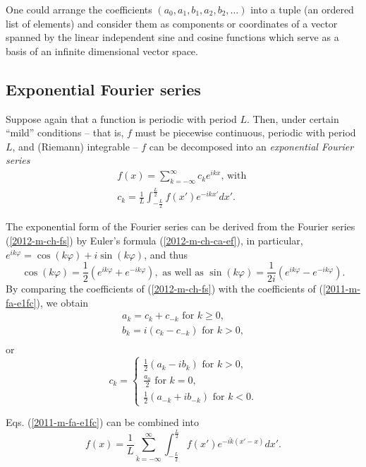 One could arrange the coefficients
$(a_0,a_1,b_1,a_2,b_2, \ldots)$
into a tuple (an ordered list of elements)
and consider them as components or coordinates of a vector spanned by the
linear independent sine and cosine functions which serve as a basis of an infinite
dimensional vector space.



\subsection{Exponential Fourier series}




Suppose again that a function is periodic
with period $L$.
Then, under certain ``mild'' conditions
-- that is, $f$ must be piecewise continuous, periodic with period $L$,  and (Riemann) integrable --
$f$ can be decomposed  into an {\em exponential Fourier series}
\begin{equation}
\begin{split}
f(x)= \sum _{k=-\infty}^\infty c_k e^{ikx} \textrm{, with } \\
c_k=\frac{1}{L}\int_{-\frac{L}{2}}^{\frac{L}{2}} f(x') e^{-ikx'} dx'.
\end{split}
\label{2011-m-fa-e1fc}
\end{equation}

{\color{OliveGreen}
\bproof

The exponential form of the Fourier series
can be derived from the Fourier series (\ref{2012-m-ch-fs}) by
Euler's formula  (\ref{2012-m-ch-ca-ef}), in particular,
$e^{ik\varphi} = \cos (k\varphi )+i \sin (k\varphi )$, and thus
$$
\cos (k\varphi ) =\frac{1}{2}\left(e^{ik\varphi}+e^{-ik\varphi}\right)
,\textrm{ as well as }
\sin (k\varphi ) =\frac{1}{2i}\left(e^{ik\varphi}-e^{-ik\varphi} \right)
.
$$
By comparing the coefficients of (\ref{2012-m-ch-fs}) with the coefficients of (\ref{2011-m-fa-e1fc}),
we obtain
\begin{equation}
\begin{split}
a_k= c_k+c_{-k} \textrm{ for } k \ge 0,\\
b_k= i(c_k-c_{-k})\textrm{ for } k > 0  ,\\
\end{split}
\label{2011-m-fa-e1fccc1}
\end{equation}
or
\begin{equation}
c_k=
\left\{
\begin{split}
\frac{1}{2}(a_k-ib_k) \textrm{ for } k > 0,\\
\frac{a_0}{2} \textrm{ for } k = 0,\\
\frac{1}{2}(a_{-k}+ib_{-k}) \textrm{ for } k < 0.
\end{split}
\right.
\label{2011-m-fa-e1fccc2}
\end{equation}

Eqs. (\ref{2011-m-fa-e1fc}) can be combined into
\begin{equation}
f(x)= \frac{1}{L}\sum _{\check{k}=-\infty}^\infty  \int_{-\frac{L}{2}}^\frac{L}{2} f(x') e^{-i{\check{k}(x'-x)}} dx'
.
\label{2011-m-eft1}
\end{equation}

\eproof
}




